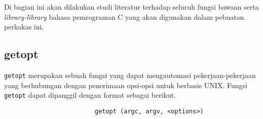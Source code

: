 Di bagian ini akan dilakukan studi literatur terhadap seluruh fungsi bawaan serta \textit{library-library} bahasa pemrograman C yang akan digunakan dalam pebuatan perkakas ini.

\subsection{getopt \cite{loosemore:2022:gnuclibrary}}
\label{sec:cmodules-getopt}

\verb|getopt| merupakan sebuah fungsi yang dapat mengautomasi pekerjaan-pekerjaan yang berhubungan dengan penerimaan opsi-opsi untuk \cl berbasis UNIX.
\newline\newline\noindent
Fungsi \verb|getopt| dapat dipanggil dengan format sebagai berikut.

\begin{verbatim}
                         getopt (argc, argv, <options>)
\end{verbatim}

